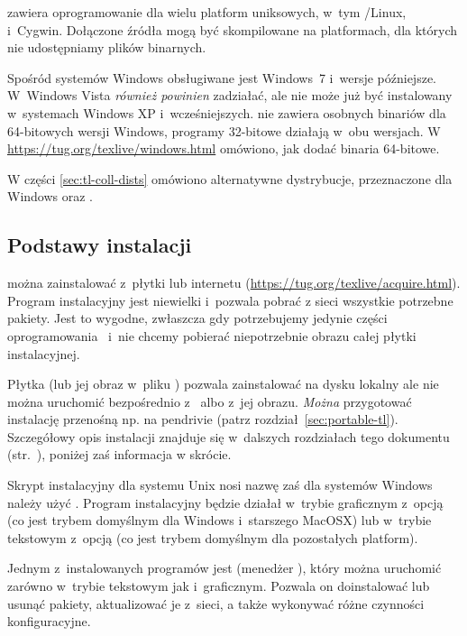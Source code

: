 \documentclass{article}
\begin{document}
\TL{} zawiera oprogramowanie dla wielu platform uniksowych,
w~tym \GNU/Linux, \MacOSX i~Cyg\-win. Dołączone źródła mogą być skompilowane
na platformach, dla których nie udostępniamy plików binarnych. %

Spośród systemów Windows obsługiwane jest Windows~7 i~wersje
późniejsze. W~Windows Vista  \emph{również powinien}
zadziałać, ale \TL{} nie może już być instalowany w~systemach Windows XP i~wcześniejszych.
\TL{} nie zawiera osobnych binariów dla 64-bitowych wersji Windows, programy 32-bitowe
działają w~obu wersjach.  W \url{https://tug.org/texlive/windows.html} omówiono, jak
dodać binaria 64-bitowe.

W części \ref{sec:tl-coll-dists} omówiono alternatywne dystrybucje,
przeznaczone dla Windows oraz \MacOSX.

\subsection{Podstawy instalacji \protect\TL{}}
\label{sec:basic}

\TL{} można zainstalować z~płytki \DVD{} lub internetu
(\url{https://tug.org/texlive/acquire.html}). Program instalacyjny
jest niewielki i~pozwala pobrać z sieci wszystkie potrzebne pakiety.
Jest to wygodne, zwłaszcza gdy potrzebujemy jedynie części oprogramowania
\TL\ i~nie chcemy pobierać niepotrzebnie obrazu całej płytki instalacyjnej.

Płytka \DVD{}  (lub jej obraz w~pliku )  pozwala
zainstalować \TL{} na dysku lokalny ale nie można  uruchomić \TL{} bezpośrednio z~\TK{} \DVD{} albo z~jej obrazu.  \emph{Można}  przygotować instalację przenośną  np. na pendrivie
(patrz rozdział~\ref{sec:portable-tl}).
Szczegółowy opis instalacji \TL{} znajduje się w~dalszych rozdziałach
tego dokumentu (str.~\pageref{sec:install}), poniżej zaś informacja w skrócie.
\begin{itemize*}
\item Skrypt instalacyjny dla systemu Unix nosi nazwę  zaś dla systemów Windows
należy użyć . Program instalacyjny będzie działał w~trybie graficznym
z~opcją  (co jest trybem domyślnym dla Windows i~starszego MacOSX) lub w~trybie tekstowym z~opcją
 (co jest trybem domyślnym dla pozostałych platform).

\item Jednym z~instalowanych programów jest  (menedżer \TL{}),
który  można uruchomić zarówno w~trybie tekstowym jak i~graficznym. Pozwala
on doinstalować lub usunąć pakiety, aktualizować je z~sieci, a także
wykonywać różne czynności konfiguracyjne.

\end{itemize*}
\end{document}
